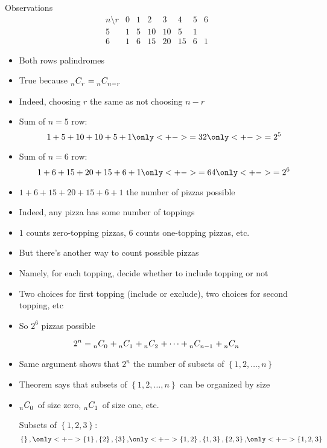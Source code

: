 \documentclass{beamer}
\theoremstyle{definition}
\newcommand\ncr[2]{\tensor[_{#1}]C{_{#2}}}
\begin{document}
\begin{frame}{Observations}
\[\begin{array}{c|ccccccc}
n\setminus r&0&1&2&3&4&5&6\\\hline
5&1&5&10&10&5&1\\
6&1&6&15&20&15&6&1
\end{array}\]
\begin{itemize}
\item Both rows palindromes
\item True because $\ncr{n}{r}=\ncr{n}{n-r}$
\item Indeed, choosing $r$ the same as \alert{not} choosing $n-r$
\item Sum of $n=5$ row:
\[1+5+10+10+5+1\only<+->{=32}\only<+->{=2^5}\]
\item Sum of $n=6$ row:
\[1+6+15+20+15+6+1\only<+->{=64}\only<+->{=2^6}\]
\end{itemize}
\end{frame}

\begin{frame}
\begin{itemize}
\item $1+6+15+20+15+6+1$ the number of pizzas possible
\item Indeed, any pizza has \alert{some} number of toppings
\item $1$ counts zero-topping pizzas, $6$ counts one-topping pizzas, etc.
\item But there's another way to count possible pizzas
\item Namely, for each topping, decide whether to include topping or not
\item Two choices for first topping (include or exclude), two choices for second
topping, etc
\item So $2^6$ pizzas possible
\end{itemize}
\end{frame}

\begin{frame}
\begin{theorem}
\[2^n=\ncr{n}{0}+\ncr{n}{1}+\ncr{n}{2}+\cdots+\ncr{n}{n-1}+\ncr{n}{n}\]
\end{theorem}
\begin{itemize}
\item Same argument shows that $2^n$ the number
of subsets of $\left\{1,2,\ldots,n\right\}$
\item Theorem says that
subsets of $\left\{1,2,\ldots,n\right\}$
can be organized by size
\item $\ncr{n}{0}$ of size zero, $\ncr{n}{1}$ of size one, etc.
\begin{example}
Subsets of $\left\{1,2,3\right\}$:
\[\left\{\right\},
\only<+->{\left\{1\right\},\left\{2\right\},\left\{3\right\},}
\only<+->{\left\{1,2\right\},\left\{1,3\right\},\left\{2,3\right\},}
\only<+->{\left\{1,2,3\right\}}\]
\end{example}
\end{itemize}
\end{frame}
\end{document}
